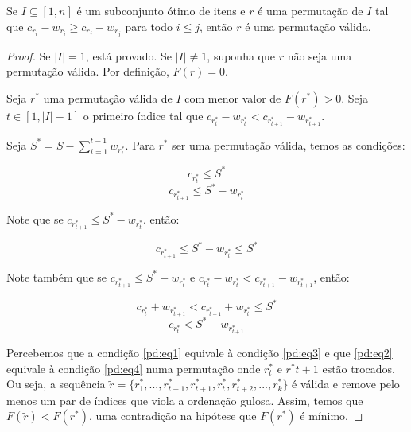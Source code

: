 \begin{theo} \label{pd:proof}
Se $I \subseteq [1, n]$ é um subconjunto ótimo de itens e $r$ é uma permutação de $I$ tal que $c_{r_i} - w_{r_i} \geq c_{r_j} - w_{r_j}$ para todo $i \leq j$, então $r$ é uma permutação válida.
\end{theo}
\begin{proof}
Se $|I| = 1$, está provado. Se $|I| \neq 1$, suponha que $r$ não seja uma permutação válida. Por definição, $F(r) = 0$.

Seja $r^*$ uma permutação válida de $I$ com menor valor de $F(r^*) > 0$. Seja $t \in [1, |I| - 1]$ o primeiro índice tal que $c_{r^*_t} - w_{r^*_t} < c_{r^*_{t + 1}} - w_{r^*_{t + 1}}$.

Seja $S^* = S - \sum_{i = 1}^{t - 1} w_{r^*_i}$. Para $r^*$ ser uma permutação válida, temos as condições:

\begin{equation}\label{pd:eq1}
  c_{r^*_t} \leq S^*
\end{equation}
\begin{equation}\label{pd:eq2}
  c_{r^*_{t + 1}} \leq S^* - w_{r^*_t}
\end{equation}

Note que se $c_{r^*_{t + 1}} \leq S^* - w_{r^*_t}$. então:

\begin{equation}\label{pd:eq3}
  c_{r^*_{t + 1}} \leq S^* - w_{r^*_t} \leq S^*
\end{equation}

Note também que se $c_{r^*_{t + 1}} \leq S^* - w_{r^*_t}$ e $c_{r^*_t} - w_{r^*_t} < c_{r^*_{t + 1}} - w_{r^*_{t + 1}}$, então: 

$$c_{r^*_{t}} + w_{r^*_{t + 1}} < c_{r^*_{t + 1}} + w_{r^*_t} \leq S^*$$
\begin{equation}\label{pd:eq4}
  c_{r^*_{t}} < S^* - w_{r^*_{t + 1}}
\end{equation}

Percebemos que a condição \ref{pd:eq1} equivale à condição \ref{pd:eq3} e que \ref{pd:eq2} equivale à condição \ref{pd:eq4} numa permutação onde $r^*_t$ e $r^*{t + 1}$ estão trocados. Ou seja, a sequência $\widetilde{r} = \{r^*_1, ..., r^*_{t - 1}, r^*_{t + 1}, r^*_t, r^*_{t + 2}, ..., r^*_k\}$ é válida e remove pelo menos um par de índices que viola a ordenação gulosa. Assim, temos que $F(\widetilde{r}) < F(r^*)$, uma contradição na hipótese que $F(r^*)$ é mínimo.
\end{proof}

